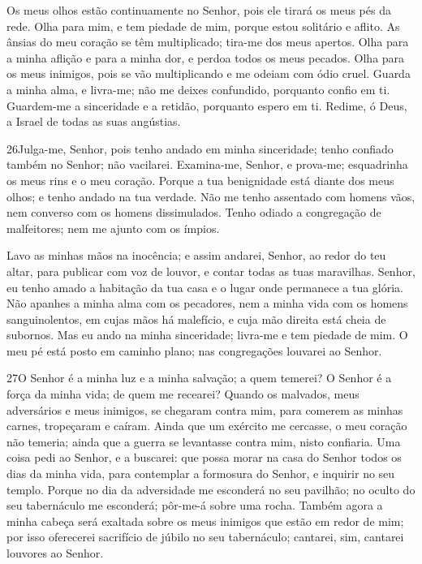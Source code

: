 Os meus olhos estão continuamente no Senhor, pois ele tirará os
meus pés da rede. Olha para mim, e tem piedade de mim, porque
estou solitário e aflito. As ânsias do meu coração se têm
multiplicado; tira-me dos meus apertos. Olha para a minha
aflição e para a minha dor, e perdoa todos os meus pecados.
Olha para os meus inimigos, pois se vão multiplicando e me
odeiam com ódio cruel. Guarda a minha alma, e livra-me; não
me deixes confundido, porquanto confio em ti. Guardem-me a
sinceridade e a retidão, porquanto espero em ti. Redime, ó
Deus, a Israel de todas as suas angústias.

\bigskip

\lettrine{26}{}Julga-me, Senhor, pois tenho andado em minha
sinceridade; tenho confiado também no Senhor; não vacilarei.
Examina-me, Senhor, e prova-me; esquadrinha os meus rins e o meu
coração. Porque a tua benignidade está diante dos meus olhos; e
tenho andado na tua verdade. Não me tenho assentado com homens
vãos, nem converso com os homens dissimulados. Tenho odiado a
congregação de malfeitores; nem me ajunto com os ímpios.

Lavo as minhas mãos na inocência; e assim andarei, Senhor, ao
redor do teu altar, para publicar com voz de louvor, e contar
todas as tuas maravilhas. Senhor, eu tenho amado a habitação da
tua casa e o lugar onde permanece a tua glória. Não apanhes a
minha alma com os pecadores, nem a minha vida com os homens
sanguinolentos, em cujas mãos há malefício, e cuja mão
direita está cheia de subornos. Mas eu ando na minha
sinceridade; livra-me e tem piedade de mim. O meu pé está
posto em caminho plano; nas congregações louvarei ao Senhor.

\bigskip

\lettrine{27}{}O Senhor é a minha luz e a minha salvação; a
quem temerei? O Senhor é a força da minha vida; de quem me recearei?
Quando os malvados, meus adversários e meus inimigos, se
chegaram contra mim, para comerem as minhas carnes, tropeçaram e
caíram. Ainda que um exército me cercasse, o meu coração não
temeria; ainda que a guerra se levantasse contra mim, nisto
confiaria. Uma coisa pedi ao Senhor, e a buscarei: que possa
morar na casa do Senhor todos os dias da minha vida, para contemplar
a formosura do Senhor, e inquirir no seu templo. Porque no dia
da adversidade me esconderá no seu pavilhão; no oculto do seu
tabernáculo me esconderá; pôr-me-á sobre uma rocha. Também agora
a minha cabeça será exaltada sobre os meus inimigos que estão em
redor de mim; por isso oferecerei sacrifício de júbilo no seu
tabernáculo; cantarei, sim, cantarei louvores ao Senhor.

